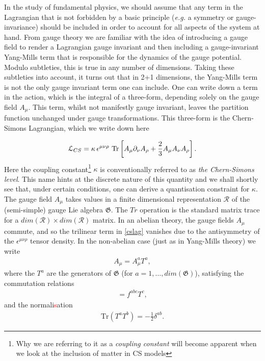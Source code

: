     In the study of fundamental physics, we should assume that any term in the Lagrangian that is not forbidden by a basic principle (\textit{e.g.} a symmetry or gauge-invariance) should be included in order to account for all aspects of the system at hand. From gauge theory we are familiar with the idea of introducing a gauge field to render a Lagrangian gauge invariant and then including a gauge-invariant Yang-Mills term that is responsible for the dynamics of the gauge potential. Modulo subtleties, this is true in any number of dimensions. Taking these subtleties into account, it turns out that in 2+1 dimensions, the Yang-Mills term is not the only gauge invariant term one can include. One can write down a term in the action, which is the integral of a three-form, depending solely on the gauge field $A_{\mu}$. This term, whilst not manifestly gauge invariant, leaves the partition function unchanged under gauge transformations. This three-form is the Chern-Simons Lagrangian, which we write down here

\begin{equation}
    {\mathcal{L}}_{CS}= \kappa \, \epsilon^{\mu\nu\rho} \  \mathrm{Tr} \left[ A_\mu\partial_\nu A_\rho +{2\over 3} A_\mu A_\nu A_\rho \right].
\label{cslag}
\end{equation}
 Here the coupling constant\footnote{Why we are referring to it as a \textit{coupling constant} will become apparent when we look at the inclusion of matter in CS models} $\kappa$ is conventionally referred to as \textit{the Chern-Simons level}. This name hints at the discrete nature of this quantity and we shall shortly see that, under certain conditions, one can derive a quantisation constraint for $\kappa$. The gauge field $A_\mu$ takes values in a finite dimensional representation $\mathcal{R}$ of the (semi-simple) gauge Lie algebra ${\mathfrak{G}}$. The $Tr$ operation is the standard matrix trace for a $dim(\mathcal{R})\times dim(\mathcal{R})$ matrix.  In an abelian theory, the gauge fields
$A_\mu$ commute, and so the trilinear term in \eqref{cslag} vanishes due to the
antisymmetry of the $\epsilon^{\mu\nu\rho}$ tensor density. In the non-abelian case (just as in Yang-Mills theory) we write
\begin{align}
    A_\mu=A_\mu^a T^a,
\end{align}
 where the $T^a$ are the generators of ${\mathfrak{G}}$ (for $a=1,\dots, dim({\mathfrak{G}})$), satisfying the commutation relations
 \begin{align}
    [T^a,T^b]=f^{abc}T^c,
 \end{align}
and the normali\textcolor{red}{s}ation 
\begin{align}
    \mathrm{Tr}(T^a T^b)=-\frac{1}{2}\delta^{ab}.
\end{align}


